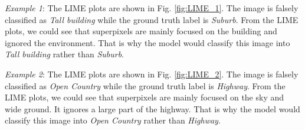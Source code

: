 \emph{Example 1}: The LIME plots are shown in Fig. \ref{fig:LIME_1}. The image is falsely classified as \emph{Tall building} while the ground truth label is \emph{Suburb}. From the LIME plots, we could see that superpixels are mainly focused on the building and ignored the environment. That is why the model would classify this image into \emph{Tall building} rather than \emph{Suburb}.


\emph{Example 2}: The LIME plots are shown in Fig. \ref{fig:LIME_2}. The image is falsely classified as \emph{Open Country} while the ground truth label is \emph{Highway}. From the LIME plots, we could see that superpixels are mainly focused on the sky and wide ground. It ignores a large part of the highway. That is why the model would classify this image into \emph{Open Country} rather than \emph{Highway}.

